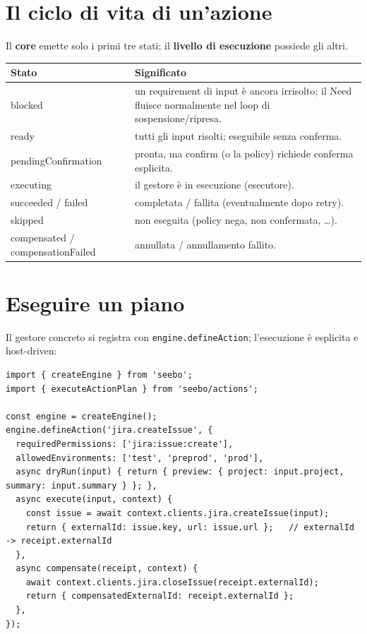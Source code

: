 \documentclass[11pt,a4paper]{book}
\let\code\lstinline
\newcommand{\ic}[1]{{\ttfamily #1}}
\theoremstyle{definition}
\begin{document}
{{{{\section{Il ciclo di vita di un'azione}

Il \textbf{core} emette solo i primi tre stati; il \textbf{livello di esecuzione}
possiede gli altri.

\begin{center}
\small
\begin{tabular}{@{}l p{9.6cm}@{}}
\toprule
\textbf{Stato} & \textbf{Significato} \\
\midrule
\ic{blocked} & un requirement di \ic{input} è ancora irrisolto; il \ic{Need} fluisce
normalmente nel loop di sospensione/ripresa. \\
\ic{ready} & tutti gli input risolti; eseguibile senza conferma. \\
\ic{pendingConfirmation} & pronta, ma \ic{confirm} (o la policy) richiede conferma
esplicita. \\
\ic{executing} & il gestore è in esecuzione (esecutore). \\
\ic{succeeded} / \ic{failed} & completata / fallita (eventualmente dopo retry). \\
\ic{skipped} & non eseguita (policy nega, non confermata, \ldots). \\
\ic{compensated} / \ic{compensationFailed} & annullata / annullamento fallito. \\
\bottomrule
\end{tabular}
\end{center}

\section{Eseguire un piano}

Il gestore concreto si registra con \code|engine.defineAction|; l'esecuzione è
esplicita e host-driven:

\begin{lstlisting}
import { createEngine } from 'seebo';
import { executeActionPlan } from 'seebo/actions';

const engine = createEngine();
engine.defineAction('jira.createIssue', {
  requiredPermissions: ['jira:issue:create'],
  allowedEnvironments: ['test', 'preprod', 'prod'],
  async dryRun(input) { return { preview: { project: input.project, summary: input.summary } }; },
  async execute(input, context) {
    const issue = await context.clients.jira.createIssue(input);
    return { externalId: issue.key, url: issue.url };   // externalId -> receipt.externalId
  },
  async compensate(receipt, context) {
    await context.clients.jira.closeIssue(receipt.externalId);
    return { compensatedExternalId: receipt.externalId };
  },
});


\end{lstlisting}}}}}
\end{document}

